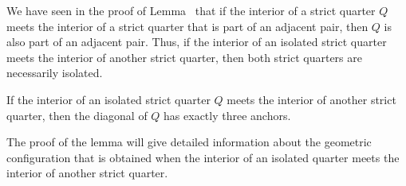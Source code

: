\begin{remark}
We have seen in the proof of Lemma~ that if
the interior of a strict quarter $Q$ meets the interior of a
strict quarter that is part of an adjacent pair, then $Q$ is also
part of an adjacent pair. Thus, if the interior of an isolated
strict quarter meets the interior of another strict quarter, then
both strict quarters are necessarily isolated.
\end{remark}

\begin{lemma}
If the interior of an isolated strict quarter $Q$ meets the
interior of another strict quarter, then the diagonal of $Q$ has
exactly three anchors.
\end{lemma}

The proof of the lemma will give detailed information about the
geometric configuration that is obtained when the interior of an
isolated quarter meets the interior of another strict quarter.


